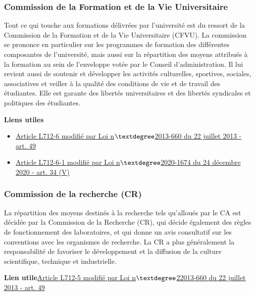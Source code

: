 \subsubsection*{Commission de la Formation et de la Vie Universitaire}
Tout ce qui touche aux formations d\'elivr\'ees par l'universit\'e est du ressort de la Commission de la Formation et de la Vie Universitaire (CFVU). La commission se prononce en particulier sur les programmes de formation des diff\'erentes composantes de l'universit\'e, mais aussi sur la r{\'e}partition des moyens attribu\'es \`a la formation au sein de l'enveloppe vot\'ee par le Conseil d'administration. Il lui revient aussi de soutenir et d\'evelopper les activit{\'e}s culturelles, sportives, sociales, associatives et veiller \`a la qualit\'e des conditions de vie et de travail des {\'e}tudiant\mp e\mp s. Elle est garante des libert{\'e}s universitaires et des libert{\'e}s syndicales et politiques des {\'e}tudiant\mp e\mp s. 

\textbf{Liens utiles}
\begin{itemize}
\item \href{https://www.legifrance.gouv.fr/codes/article_lc/LEGIARTI000027747967}{Article L712-6 modifi{\'e} par Loi n$\textdegree$2013-660 du 22 juillet 2013 - art. 49}
\item \href{https://www.legifrance.gouv.fr/codes/article_lc/LEGIARTI000027747991/2023-04-15/}{Article L712-6-1 modifi{\'e} par Loi n$\textdegree$2020-1674 du 24 d\'ecembre 2020 - art. 34 (V)}
\end{itemize}

\subsubsection*{Commission de la recherche (CR)}
La r\'epartition des moyens destin{\'e}s \`a la recherche tels qu'allou{\'e}s par le CA est d\'ecid\'ee par la Commission de la Recherche (CR), qui d\'ecide \'egalement des r{\`e}gles de fonctionnement des laboratoires, et qui donne un avis consultatif sur les conventions avec les organismes de recherche. La CR a plus g\'en\'eralement la responsabilit\'e de favoriser le d\'eveloppement et la diffusion de la culture scientifique, technique et industrielle.

\textbf{Lien utile\hspace{.5em}}\href{https://www.legifrance.gouv.fr/codes/article_lc/LEGIARTI000027747971}{Article L712-5   modifi{\'e} par Loi n$\textdegree$22013-660 du 22 juillet 2013 - art. 49}

